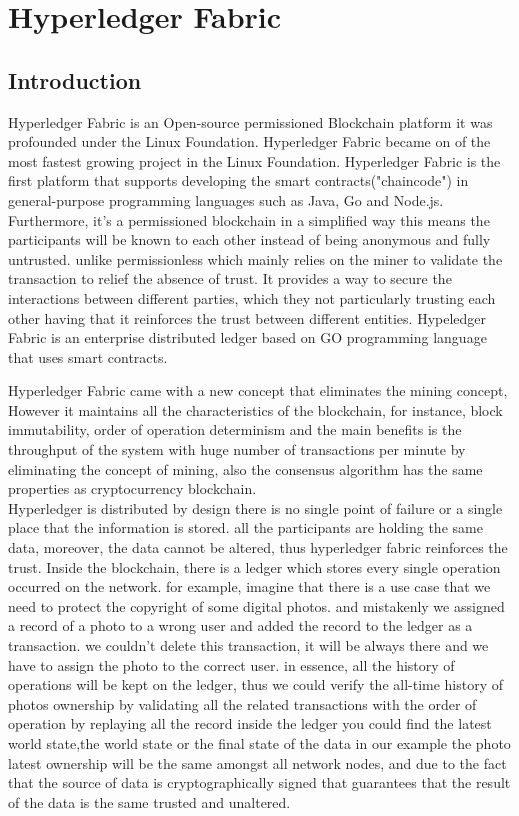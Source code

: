 \section{Hyperledger Fabric}
 
\subsection{Introduction}
Hyperledger Fabric is an Open-source permissioned Blockchain platform it was profounded under the Linux Foundation. Hyperledger Fabric became on of the most fastest growing project in the Linux Foundation. 
Hyperledger Fabric is the first platform that supports developing the smart contracts("chaincode") in general-purpose programming languages such as Java, Go and Node.js.
Furthermore, it's a permissioned blockchain in a simplified way this means the participants will be known to each other instead of being anonymous and fully untrusted. unlike permissionless which mainly relies on the miner to validate the transaction to relief the absence of trust. 
It provides a way to secure the interactions between different parties, which they not particularly trusting  each other having that it reinforces the trust between different entities.
Hypeledger Fabric is an enterprise distributed ledger based on GO programming language that uses smart contracts. 

Hyperledger Fabric came with a new concept that eliminates the mining concept, However it maintains all the characteristics of the blockchain, for instance, block immutability, order of operation determinism and the main benefits is the throughput of the system with huge number of transactions per minute by eliminating the concept of mining, also the consensus algorithm has the same properties as cryptocurrency blockchain. \\ 

Hyperledger is distributed by design there is no single point of failure or a single place that the information is stored.
all the participants are holding the same data, moreover, the data cannot be altered, thus hyperledger fabric reinforces the trust. 
Inside the blockchain, there is a ledger which stores every single operation occurred on the network. 
for example, imagine that there is a use case that we need to protect the copyright of some digital photos. and mistakenly we assigned a record of a photo to a wrong user and added the record to the ledger as a transaction. we couldn't delete this transaction, it will be always there and we have to assign the photo to the correct user. in essence, all the history of operations will be kept on the ledger, thus we could verify the all-time history of photos ownership by validating all the related transactions with the order of operation by replaying all the record inside the ledger you could find the latest world state,the world state or the final state of the data in our example the photo latest ownership will be the same amongst all network nodes, and due to the fact that the source of data is cryptographically signed that guarantees that the result of the data is the same trusted and unaltered. \\ 

